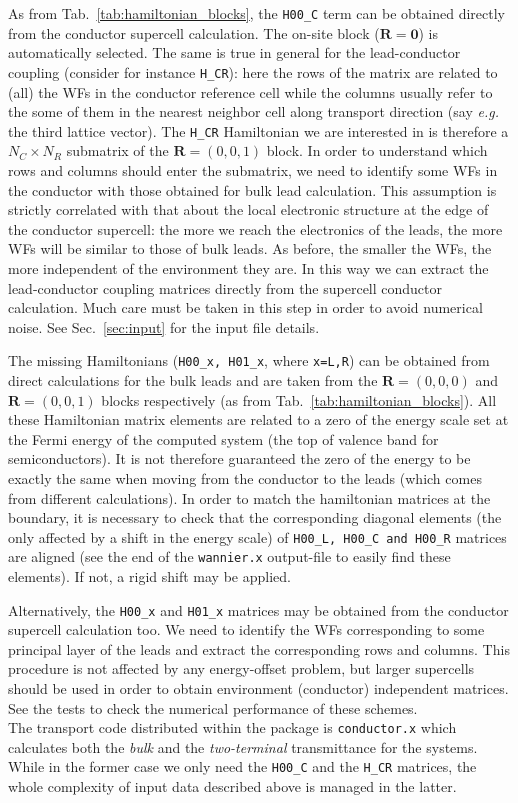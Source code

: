 As from Tab.~\ref{tab:hamiltonian_blocks}, the {\tt H00\_C} term
can be obtained directly from the conductor supercell calculation.
The on-site block ($\mathbf{R}=\mathbf{0}$) is automatically
selected. The same is true in general for the lead-conductor
coupling (consider for instance {\tt H\_CR}): here the rows of the
matrix are related to (all) the WFs in the conductor reference
cell while the columns usually refer to the some of them in the
nearest neighbor cell along transport direction (say {\it e.g.}
the third lattice vector). The {\tt H\_CR} Hamiltonian we are
interested in is therefore a $N_C \times N_R$ submatrix of the
$\mathbf{R}=(0,0,1)$ block. In order to understand which rows and
columns should enter the submatrix, we need to identify some WFs
in the conductor with those obtained for bulk lead calculation.
This assumption is strictly correlated with that about the local
electronic structure at the edge of the conductor supercell: the
more we reach the electronics of the leads, the more WFs will be
similar to those of bulk leads. As before, the smaller the WFs,
the more independent of the environment they are. In this way we
can extract the lead-conductor coupling matrices directly from the
supercell conductor calculation. Much care must be taken in this
step in order to avoid numerical noise. See Sec.~\ref{sec:input}
for the input file details.

The missing Hamiltonians ({\tt H00\_x, H01\_x}, where {\tt x=L,R})
can be obtained from direct calculations for the bulk leads and
are taken from the $\mathbf{R}=(0,0,0)$ and $\mathbf{R}=(0,0,1)$
blocks respectively (as from Tab.~\ref{tab:hamiltonian_blocks}).
All these Hamiltonian matrix elements are related to a zero of the
energy scale set at the Fermi energy of the computed system (the
top of valence band for semiconductors). It is not therefore
guaranteed the zero of the energy to be exactly the same when
moving from the conductor to the leads (which comes from different
calculations). In order to match the hamiltonian matrices at the
boundary, it is necessary to check that the corresponding diagonal
elements (the only affected by a shift in the energy scale) of
{\tt H00\_L, H00\_C and H00\_R} matrices are aligned (see the end
of the {\tt wannier.x} output-file to easily find these elements).
If not, a rigid shift may be applied.

Alternatively, the {\tt H00\_x} and {\tt H01\_x} matrices may be
obtained from the conductor supercell calculation too. We need to
identify the WFs corresponding to some principal layer of the
leads and extract the corresponding rows and columns. This
procedure is not affected by any energy-offset problem, but larger
supercells should be used in order to obtain environment
(conductor) independent matrices. See the tests to check the
numerical performance of these schemes.
%
\\

\noindent The transport code distributed within the \WANT{} package is
{\tt conductor.x} which calculates both the
{\em bulk} and the {\em two-terminal} transmittance for the systems.
While in the former case we
only need the {\tt H00\_C} and the {\tt H\_CR} matrices, the whole complexity
of input data described above is managed in the latter.
